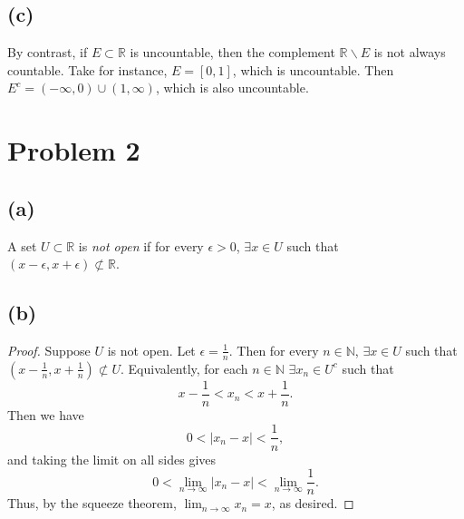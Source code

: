 \documentclass{article}
\newcommand{\R}{\mathbb{R}} %
\newcommand{\N}{\mathbb{N}} %
\begin{document}
\subsection*{(c)}
By contrast, if $E \subset \R$ is uncountable, then the complement $\R \backslash E$ is not always countable. Take for instance, $E = [0 , 1]$, which is uncountable. Then \\$E^c = (-\infty, 0) \cup (1, \infty)$, which is also uncountable.
\section*{Problem 2}
\subsection*{(a)}
A set $U \subset \R$ is \textit{not open} if for every $\epsilon > 0$, $\exists x \in U$ such that \\$(x-\epsilon, x+\epsilon) \not\subset \R$.

\subsection*{(b)}
\begin{proof}
	Suppose $U$ is not open. Let $\epsilon = \frac{1}{n}$. Then for every $n \in \N$, $\exists x \in U$ such that $(x-\frac{1}{n}, x + \frac{1}{n}) \not \subset U$. Equivalently, for each $n \in \N$ $\exists x_n \in U^c$ such that
	\begin{equation}
		x - \frac{1}{n} < x_n < x + \frac{1}{n}.
	\end{equation}
	Then we have
	\begin{equation}
		0 < |x_n - x| < \frac{1}{n},
	\end{equation}
	and taking the limit on all sides gives
	\begin{equation}
		0 < \lim_{n \to \infty} |x_n - x| < \lim_{n \to \infty} \frac{1}{n}.
	\end{equation}
	Thus, by the squeeze theorem, $\lim_{n \to \infty} x_n = x$, as desired.
\end{proof}
\end{document}
